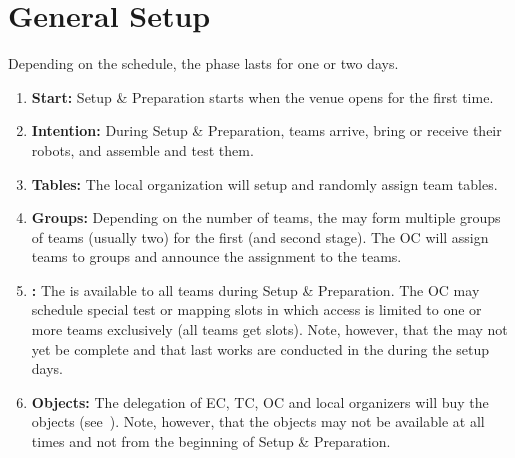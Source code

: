 \section{General Setup}
\label{sec:general_setup}
Depending on the schedule, the  phase lasts for one or two days.

\begin{enumerate}
	\item \textbf{Start:} Setup \& Preparation starts when the venue opens for the first time.
	\item \textbf{Intention:} During Setup \& Preparation, teams arrive, bring or receive their robots, and assemble and test them.
	\item \textbf{Tables:} The local organization will setup and randomly assign team tables.
	\item \textbf{Groups:} Depending on the number of teams, the  may form multiple groups of teams (usually two) for the first (and second stage). The OC will assign teams to groups and announce the assignment to the teams.
	\item \textbf{\Arena{}:} The \Arena{} is available to all teams during Setup \& Preparation. The OC may schedule special test or mapping slots in which \Arena{} access is limited to one or more teams exclusively (all teams get slots). Note, however, that the \Arena{} may not yet be complete and that last works are conducted in the \Arena{} during the setup days.
	\item \textbf{Objects:} The delegation of EC, TC, OC and local organizers will buy the objects (see~). Note, however, that the objects may not be available at all times and not from the beginning of Setup \& Preparation.
\end{enumerate}

